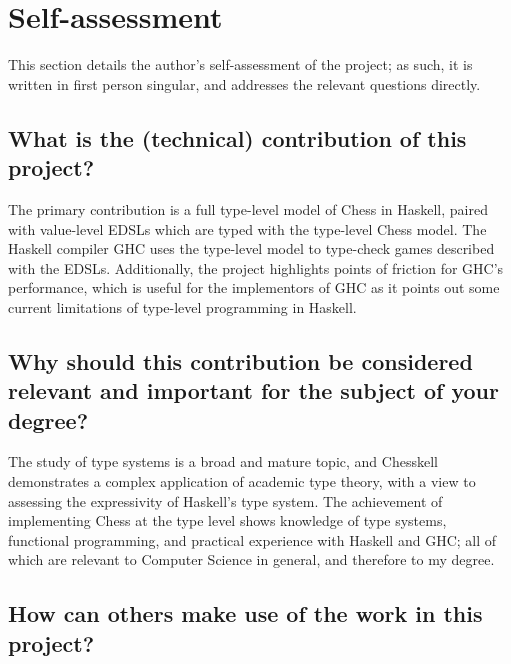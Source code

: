 \section{Self-assessment}

This section details the author's self-assessment of the project; as such, it is written in first person singular, and addresses the relevant questions directly.

\subsection{What is the (technical) contribution of this project?}

The primary contribution is a full type-level model of Chess in Haskell, paired with value-level EDSLs which are typed with the type-level Chess model. The Haskell compiler GHC uses the type-level model to type-check games described with the EDSLs. Additionally, the project highlights points of friction for GHC's performance, which is useful for the implementors of GHC as it points out some current limitations of type-level programming in Haskell.


\subsection{Why should this contribution be considered relevant and important for the subject of your degree?}

The study of type systems is a broad and mature topic, and Chesskell demonstrates a complex application of academic type theory, with a view to assessing the expressivity of Haskell's type system. The achievement of implementing Chess at the type level shows knowledge of type systems, functional programming, and practical experience with Haskell and GHC; all of which are relevant to Computer Science in general, and therefore to my degree.


\subsection{How can others make use of the work in this project?}

